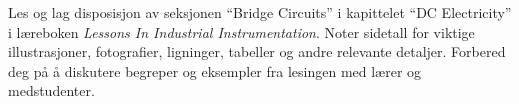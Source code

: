 

Les og lag disposisjon av seksjonen ``Bridge Circuits'' i kapittelet ``DC Electricity'' i læreboken {\it Lessons In Industrial Instrumentation}. Noter sidetall for viktige illustrasjoner, fotografier, ligninger, tabeller og andre relevante detaljer. Forbered deg på å diskutere begreper og eksempler fra lesingen med lærer og medstudenter.
















